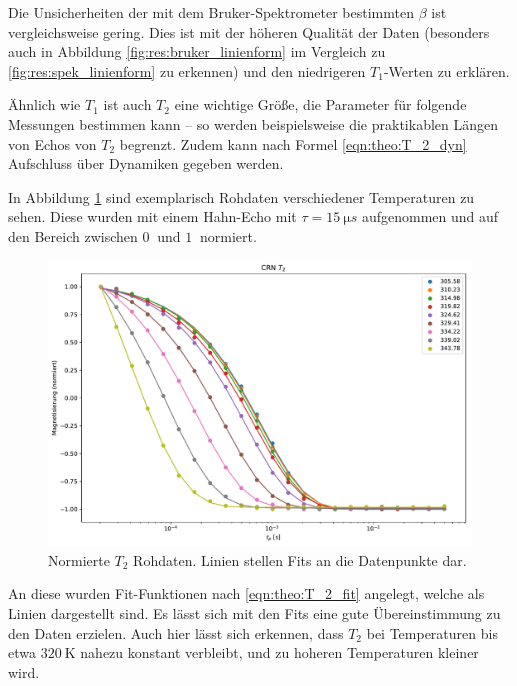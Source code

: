 Die Unsicherheiten der mit dem Bruker-Spektrometer bestimmten $\beta$ ist vergleichsweise gering. Dies ist mit der höheren Qualität der Daten (besonders auch in Abbildung \ref{fig:res:bruker_linienform} im Vergleich zu \ref{fig:res:spek_linienform} zu erkennen) und den niedrigeren $T_1$-Werten zu erklären.



\par\bigskip


Ähnlich wie $T_1$ ist auch $T_2$ eine wichtige Größe, die Parameter für folgende Messungen bestimmen kann -- so werden beispielsweise die praktikablen Längen von Echos von $T_2$ begrenzt. Zudem kann nach Formel \eqref{eqn:theo:T_2_dyn} Aufschluss über Dynamiken gegeben werden.

In Abbildung \ref{fig:res:T_2_roh} sind exemplarisch Rohdaten verschiedener Temperaturen zu sehen. Diese wurden mit einem Hahn-Echo mit $\tau = \SI{15}{\micro s}$ aufgenommen und auf den Bereich zwischen $\SI{0}{}$ und $\SI{1}{}$ normiert.
\begin{figure}
	\begin{center}
		\includegraphics[width=.9\textwidth]{graphics/plots/T2/t2_roh.pdf}
	\end{center}
	\caption{Normierte $T_2$ Rohdaten. Linien stellen Fits an die Datenpunkte dar.} \label{fig:res:T_2_roh}
\end{figure}

An diese wurden Fit-Funktionen nach \eqref{eqn:theo:T_2_fit} angelegt, welche als Linien dargestellt sind. Es lässt sich mit den Fits eine gute Übereinstimmung zu den Daten erzielen. Auch hier lässt sich erkennen, dass $T_2$ bei Temperaturen bis etwa $\SI{320}{\kelvin}$ nahezu konstant verbleibt, und zu hoheren Temperaturen kleiner wird.

